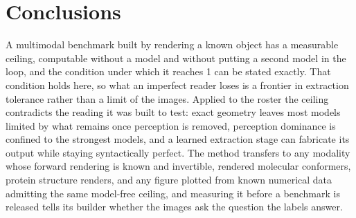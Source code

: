 \section{Conclusions}
A multimodal benchmark built by rendering a known object has a measurable ceiling, computable without a model
and without putting a second model in the loop, and the condition under which it reaches 1 can be stated
exactly. That condition holds here, so what an imperfect reader loses is a frontier in extraction tolerance
rather than a limit of the images. Applied to the roster the ceiling contradicts the reading it was built to
test: exact geometry leaves most models limited by what remains once perception is removed, perception
dominance is confined to the strongest models, and a learned extraction stage can fabricate its output while
staying syntactically perfect. The method transfers to any modality whose forward rendering is known and
invertible, rendered molecular conformers, protein structure renders, and any figure plotted from known
numerical data admitting the same model-free ceiling, and measuring it before a benchmark is released tells
its builder whether the images ask the question the labels answer.
